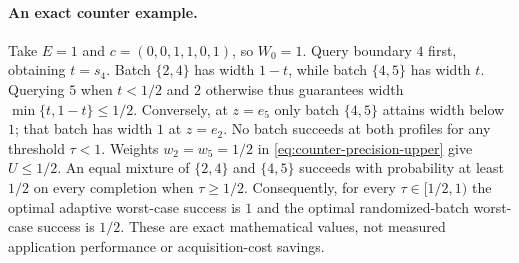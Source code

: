 \documentclass[12pt]{article}
\begin{document}
\paragraph{An exact counter example.}
Take $E=1$ and $c=(0,0,1,1,0,1)$, so $W_0=1$.
Query boundary $4$ first, obtaining $t=s_4$.
Batch $\{2,4\}$ has width $1-t$, while batch $\{4,5\}$ has width $t$.
Querying $5$ when $t<1/2$ and $2$ otherwise thus guarantees
width $\min\{t,1-t\}\leq1/2$.
Conversely, at $z=e_5$ only batch $\{4,5\}$ attains width below $1$;
that batch has width $1$ at $z=e_2$. No batch succeeds at both profiles
for any threshold $\tau<1$. Weights $w_2=w_5=1/2$ in
\eqref{eq:counter-precision-upper} give $U\leq1/2$.
An equal mixture of $\{2,4\}$ and $\{4,5\}$ succeeds with probability
at least $1/2$ on every completion when $\tau\geq1/2$.
Consequently, for every $\tau\in[1/2,1)$ the optimal adaptive worst-case
success is $1$ and the optimal randomized-batch worst-case success is
$1/2$. These are exact mathematical values, not measured application
performance or acquisition-cost savings.
\end{document}
